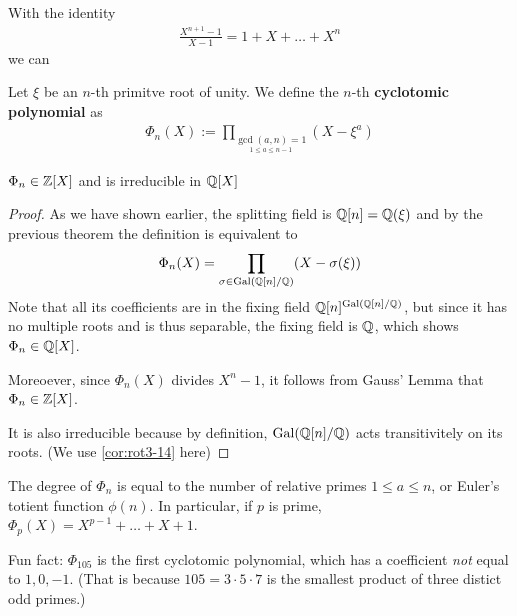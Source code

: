 With the identity
\begin{align*}
  \frac{X^{n+1}-1}{X-1} = 1 + X + \ldots + X^{n}
\end{align*}
we can 


\begin{dfn}[]\label{dfn:cyclotomic-polynomial}
  Let $\xi$ be an $n$-th primitve root of unity.
  We define the $n$-th \textbf{cyclotomic polynomial} as
  \begin{align*}
    \Phi_n(X) := \prod_{\underset{1 \leq a \leq n-1}{\gcd(a,n)=1}} (X - \xi^{a})
  \end{align*}
\end{dfn}

\begin{cor}[]
  $\Phi_n \in \mathbb{Z}[X]$ and is irreducible in $\mathbb{Q}[X]$
\end{cor}
\begin{proof}
  As we have shown earlier, the splitting field is $\mathbb{Q}[n] = \mathbb{Q}(\xi)$ and by the previous theorem the definition is equivalent to
  \begin{align*}
    \Phi_n(X) = \prod_{\sigma \in \operatorname{Gal}(\mathbb{Q}[n]/\mathbb{Q})}(X - \sigma(\xi))
  \end{align*}
  Note that all its coefficients are in the fixing field $\mathbb{Q}[n]^{\operatorname{Gal}(\mathbb{Q}[n]/\mathbb{Q})}$, but since
  it has no multiple roots and is thus separable, the fixing field is $\mathbb{Q}$, which shows $\Phi_n \in \mathbb{Q}[X]$.

  Moreoever, since $\Phi_n(X)$ divides $X^{n}-1$, it follows from Gauss' Lemma that $\Phi_n \in \mathbb{Z}[X]$.

  It is also irreducible because by definition, $\operatorname{Gal}(\mathbb{Q}[n]/\mathbb{Q})$ acts transitivitely on its roots. (We use \ref{cor:rot3-14} here)
\end{proof}
\begin{rem}[]
  The degree of $\Phi_n$ is equal to the number of relative primes $1 \leq a \leq n$, or Euler's totient function $\phi(n)$.
  In particular, if $p$ is prime, $\Phi_p(X) = X^{p-1} + \ldots + X + 1$.
  
  Fun fact: $\Phi_{105}$ is the first cyclotomic polynomial, which has a coefficient \emph{not} equal to $1,0,-1$.
  (That is because $105 = 3 \cdot 5 \cdot 7$ is the smallest product of three distict odd primes.)
\end{rem}

